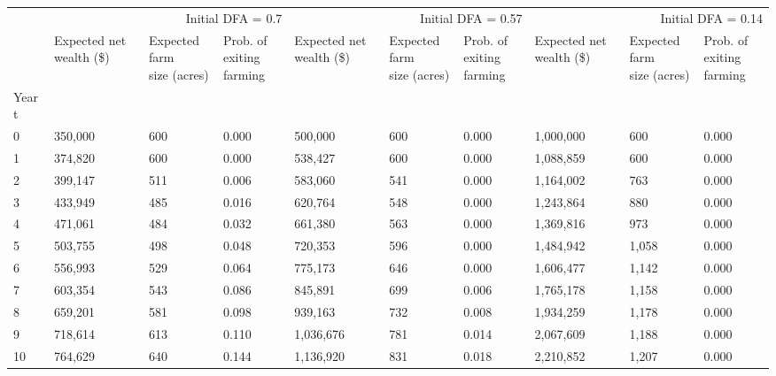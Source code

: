 \begin{tabular}{llllllllll}
\toprule
 & \multicolumn{3}{r}{Initial DFA = 0.7} & \multicolumn{3}{r}{Initial DFA = 0.57} & \multicolumn{3}{r}{Initial DFA = 0.14} \\
 & \makecell{Expected net\\wealth (\$)} & \makecell{Expected farm\\size (acres)} & \makecell{Prob. of exiting\\farming} & \makecell{Expected net\\wealth (\$)} & \makecell{Expected farm\\size (acres)} & \makecell{Prob. of exiting\\farming} & \makecell{Expected net\\wealth (\$)} & \makecell{Expected farm\\size (acres)} & \makecell{Prob. of exiting\\farming} \\
Year t &  &  &  &  &  &  &  &  &  \\
\midrule
0 & 350,000 & 600 & 0.000 & 500,000 & 600 & 0.000 & 1,000,000 & 600 & 0.000 \\
1 & 374,820 & 600 & 0.000 & 538,427 & 600 & 0.000 & 1,088,859 & 600 & 0.000 \\
2 & 399,147 & 511 & 0.006 & 583,060 & 541 & 0.000 & 1,164,002 & 763 & 0.000 \\
3 & 433,949 & 485 & 0.016 & 620,764 & 548 & 0.000 & 1,243,864 & 880 & 0.000 \\
4 & 471,061 & 484 & 0.032 & 661,380 & 563 & 0.000 & 1,369,816 & 973 & 0.000 \\
5 & 503,755 & 498 & 0.048 & 720,353 & 596 & 0.000 & 1,484,942 & 1,058 & 0.000 \\
6 & 556,993 & 529 & 0.064 & 775,173 & 646 & 0.000 & 1,606,477 & 1,142 & 0.000 \\
7 & 603,354 & 543 & 0.086 & 845,891 & 699 & 0.006 & 1,765,178 & 1,158 & 0.000 \\
8 & 659,201 & 581 & 0.098 & 939,163 & 732 & 0.008 & 1,934,259 & 1,178 & 0.000 \\
9 & 718,614 & 613 & 0.110 & 1,036,676 & 781 & 0.014 & 2,067,609 & 1,188 & 0.000 \\
10 & 764,629 & 640 & 0.144 & 1,136,920 & 831 & 0.018 & 2,210,852 & 1,207 & 0.000 \\
\bottomrule
\end{tabular}
